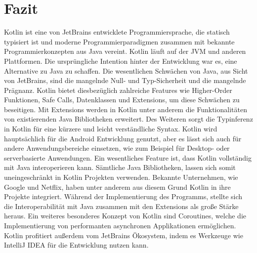 \documentclass{article}
\begin{document}
\section{Fazit}
Kotlin ist eine von JetBrains entwicklete Programmiersprache, die statisch typisiert ist und moderne Programmierparadigmen zusammen mit bekannte Programmierkonzepten aus Java vereint. Kotlin läuft auf der JVM und anderen Plattformen. Die ursprüngliche Intention hinter der Entwicklung war es, eine Alternative zu Java zu schaffen. Die wesentlichen Schwächen von Java, aus Sicht von JetBrains, sind die mangelnde Null- und Typ-Sicherheit und die mangelnde Prägnanz. Kotlin bietet diesbezüglich zahlreiche Features wie Higher-Order Funktionen, Safe Calls, Datenklassen und Extensions, um diese Schwächen zu beseitigen. Mit Extensions werden in Kotlin unter anderem die Funktionalitäten von existierenden Java Bibliotheken erweitert. Des Weiteren sorgt die Typinferenz in Kotlin für eine kürzere und leicht verständliche Syntax. Kotlin wird hauptsächlich für die Android Entwicklung genutzt, aber es lässt sich auch für andere Anwendungsbereiche einsetzen, wie zum Beispiel für Desktop- oder serverbasierte Anwendungen. Ein wesentliches Feature ist, dass Kotlin vollständig mit Java interoperieren kann. Sämtliche Java Bibliotheken, lassen sich somit uneingeschränkt in Kotlin Projekten verwenden. Bekannte Unternehmen, wie Google und Netflix, haben unter anderem aus diesem Grund Kotlin in ihre Projekte integriert. Während der Implementierung des Programms, stellte sich die Interoperabilität mit Java zusammen mit den Extensions als große Stärke heraus.  Ein weiteres besonderes Konzept von Kotlin sind Coroutines, welche die Implementierung von performanten asynchronen Applikationen ermöglichen. Kotlin profitiert außerdem vom JetBrains Ökosystem, indem es Werkzeuge wie IntelliJ IDEA für die Entwicklung nutzen kann.


\end{document}

